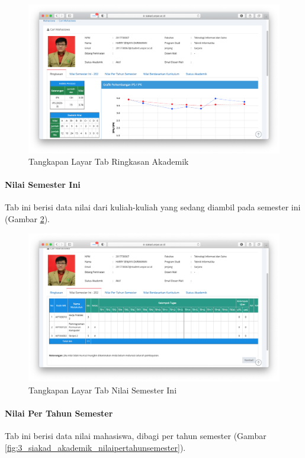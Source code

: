 \begin{figure}[H]
    \centering
    \includegraphics[scale=0.35]{Gambar/siakad_akademik_ringkasan.png}
    \caption{Tangkapan Layar Tab Ringkasan Akademik}
    \label{fig:3_siakad_akademik_ringkasan}
\end{figure}

\paragraph{Nilai Semester Ini} Tab ini berisi data nilai dari kuliah-kuliah yang sedang diambil pada semester ini (Gambar \ref{fig:3_siakad_akademik_nilaisemesterini}).

\begin{figure}[H]
    \centering
    \includegraphics[scale=0.35]{Gambar/siakad_akademik_nilaisemesterini.png}
    \caption{Tangkapan Layar Tab Nilai Semester Ini}
    \label{fig:3_siakad_akademik_nilaisemesterini}
\end{figure}

\paragraph{Nilai Per Tahun Semester} Tab ini berisi data nilai mahasiswa, dibagi per tahun semester (Gambar \ref{fig:3_siakad_akademik_nilaipertahunsemester}).

